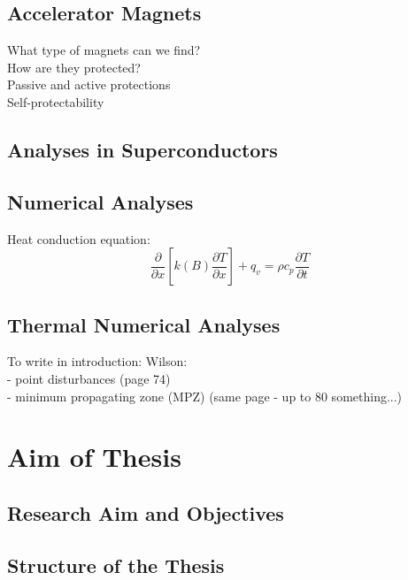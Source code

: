\documentclass{article}
\begin{document}
\subsection{Accelerator Magnets}
What type of magnets can we find? \\
How are they protected? \\
Passive and active protections \\ 
Self-protectability

\subsection{Analyses in Superconductors}

\subsection{Numerical Analyses}

Heat conduction equation: 
\begin{equation}
    \frac{\partial}{\partial x}[k(B) \frac{\partial T}{\partial x}] + q_v = \rho c_p \frac{\partial T}{\partial t}
\end{equation}

\subsection{Thermal Numerical Analyses}

To write in introduction: 
Wilson: \\
- point disturbances (page 74) \\
- minimum propagating zone (MPZ) (same page - up to 80 something...)

\clearpage \thispagestyle{empty}
\section{Aim of Thesis}

\subsection{Research Aim and Objectives}


\subsection{Structure of the Thesis}

\end{document}
